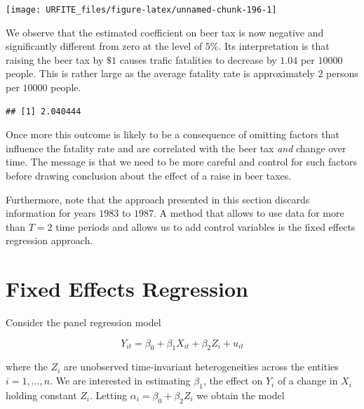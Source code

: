 \documentclass[]{book}
\newenvironment{Shaded}{\begin{snugshade}}{\end{snugshade}}
\newcommand{\KeywordTok}[1]{\textcolor[rgb]{0.13,0.29,0.53}{\textbf{#1}}}
\newcommand{\CommentTok}[1]{\textcolor[rgb]{0.56,0.35,0.01}{\textit{#1}}}
\newcommand{\OperatorTok}[1]{\textcolor[rgb]{0.81,0.36,0.00}{\textbf{#1}}}
\newcommand{\NormalTok}[1]{#1}
\theoremstyle{definition}
\theoremstyle{definition}
\theoremstyle{definition}
\theoremstyle{remark}
\begin{document}
\begin{center}\texttt{[image: URFITE\_files/figure-latex/unnamed-chunk-196-1]} \end{center}

We observe that the estimated coefficient on beer tax is now negative
and significantly different from zero at the level of \(5\%\). Its
interpretation is that raising the beer tax by \(\$1\) causes trafic
fatalities to decrease by \(1.04\) per \(10000\) people. This is rather
large as the average fatality rate is approximately \(2\) persons per
\(10000\) people.

\begin{Shaded}
\end{Shaded}

\begin{verbatim}
## [1] 2.040444
\end{verbatim}

Once more this outcome is likely to be a consequence of omitting factors
that influence the fatality rate and are correlated with the beer tax
\emph{and} change over time. The message is that we need to be more
careful and control for such factors before drawing conclusion about the
effect of a raise in beer taxes.

Furthermore, note that the approach presented in this section discards
information for years \(1983\) to \(1987\). A method that allows to use
data for more than \(T=2\) time periods and allows us to add control
variables is the fixed effects regression approach.

\section{Fixed Effects Regression}\label{fixed-effects-regression}

Consider the panel regression model

\[Y_{it} = \beta_0 + \beta_1 X_{it} + \beta_2 Z_i +  u_{it}\]

where the \(Z_i\) are unobserved time-invariant heterogeneities across
the entities \(i=1,\dots,n\). We are interested in estimating
\(\beta_1\), the effect on \(Y_i\) of a change in \(X_i\) holding
constant \(Z_i\). Letting \(\alpha_i = \beta_0 + \beta_2 Z_i\) we obtain
the model
\end{document}
